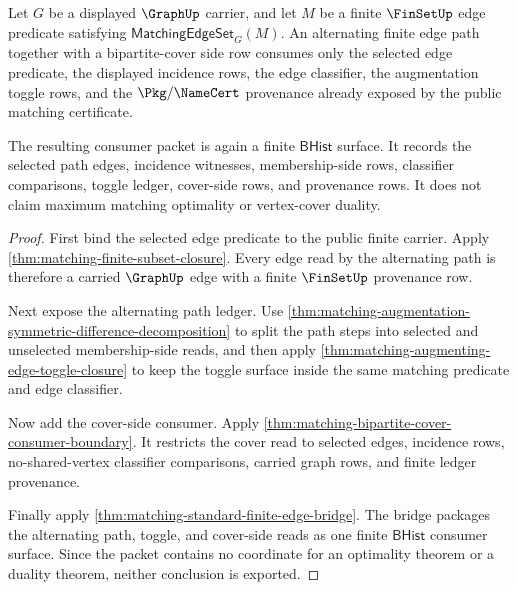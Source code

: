 \begin{theorem}
\label{thm:matching-alternating-cover-consumer-example}
Let $G$ be a displayed $\GraphUp$ carrier, and let $M$ be a finite
$\FinSetUp$ edge predicate satisfying $\mathsf{MatchingEdgeSet}_G(M)$. An
alternating finite edge path together with a bipartite-cover side row consumes
only the selected edge predicate, the displayed incidence rows, the edge
classifier, the augmentation toggle rows, and the $\Pkg/\NameCert$ provenance
already exposed by the public matching certificate.

The resulting consumer packet is again a finite $\mathsf{BHist}$ surface. It
records the selected path edges, incidence witnesses, membership-side rows,
classifier comparisons, toggle ledger, cover-side rows, and provenance rows.
It does not claim maximum matching optimality or vertex-cover duality.
\end{theorem}
\begin{proof}
First bind the selected edge predicate to the public finite carrier. Apply
\autoref{thm:matching-finite-subset-closure}. Every edge read by the
alternating path is therefore a carried $\GraphUp$ edge with a finite
$\FinSetUp$ provenance row.

Next expose the alternating path ledger. Use
\autoref{thm:matching-augmentation-symmetric-difference-decomposition} to
split the path steps into selected and unselected membership-side reads, and
then apply \autoref{thm:matching-augmenting-edge-toggle-closure} to keep the
toggle surface inside the same matching predicate and edge classifier.

Now add the cover-side consumer. Apply
\autoref{thm:matching-bipartite-cover-consumer-boundary}. It restricts the
cover read to selected edges, incidence rows, no-shared-vertex classifier
comparisons, carried graph rows, and finite ledger provenance.

Finally apply \autoref{thm:matching-standard-finite-edge-bridge}. The bridge
packages the alternating path, toggle, and cover-side reads as one finite
$\mathsf{BHist}$ consumer surface. Since the packet contains no coordinate for
an optimality theorem or a duality theorem, neither conclusion is exported.
\end{proof}

